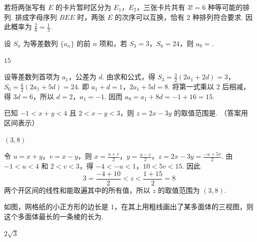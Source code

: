 \begin{solution}
若将两张写有 \(E\) 的卡片暂时区分为 \(E_1\)，\(E_2\)，三张卡片共有 \(3!=6\) 种等可能的排列. 排成字母序列 \(BEE\) 时，两张 \(E\) 的次序可以互换，恰有 \(2\) 种排列符合要求. 因此概率为 \(\frac{2}{6}=\frac{1}{3}\).
\end{solution}

\begin{problem}
设 \(S_n\) 为等差数列 \(\{a_n\}\) 的前 \(n\) 项和，若 \(S_3=3\)，\(S_6=24\)，则 \(a_9=\)\fillinblank{}.
\end{problem}

\begin{answer}
\(15\)
\end{answer}

\begin{solution}
设等差数列首项为 \(a_1\)，公差为 \(d\). 由求和公式，得
\(S_3=\frac{3}{2}(2a_1+2d)=3\)，\(S_6=\frac{6}{2}(2a_1+5d)=24\).
即 \(a_1+d=1\)，\(2a_1+5d=8\). 将第一式乘以 \(2\) 后相减，得 \(3d=6\)，所以 \(d=2\)，\(a_1=-1\). 因而
\(a_9=a_1+8d=-1+16=15\).
\end{solution}

\begin{problem}
已知 \(-1<x+y<4\) 且 \(2<x-y<3\)，则 \(z=2x-3y\) 的取值范围是\fillinblank{}. （答案用区间表示）
\end{problem}

\begin{answer}
\((3,8)\)
\end{answer}

\begin{solution}
令 \(u=x+y\)，\(v=x-y\)，则
\(x=\frac{u+v}{2}\)，\(y=\frac{u-v}{2}\)，\(z=2x-3y=\frac{-u+5v}{2}\).
由 \(-1<u<4\) 和 \(2<v<3\)，得
\(-4<-u<1\)，\(10<5v<15\). 因此
\[
3=\frac{-4+10}{2}<z<\frac{1+15}{2}=8
\]
两个开区间的线性和能取遍其中的所有值，所以 \(z\) 的取值范围为 \((3,8)\).
\end{solution}

\begin{problem}
如图，网格纸的小正方形的边长是 \(1\)，在其上用粗线画出了某多面体的三视图，则这个多面体最长的一条棱的长为\fillinblank{}.

\end{problem}

\begin{answer}
\(2\sqrt{3}\)
\end{answer}

